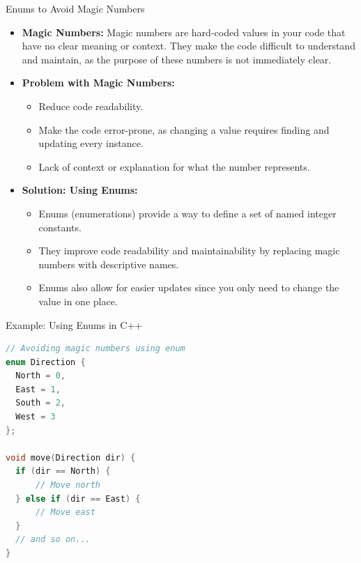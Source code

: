 \documentclass[10pt]{beamer}
\begin{document}
\begin{frame}{Enums to Avoid Magic Numbers}
  \begin{itemize}
      \item \textbf{Magic Numbers:} Magic numbers are hard-coded values in your code that have no clear meaning or context. They make the code difficult to understand and maintain, as the purpose of these numbers is not immediately clear.
      
      \item \textbf{Problem with Magic Numbers:} 
      \begin{itemize}
          \item Reduce code readability.
          \item Make the code error-prone, as changing a value requires finding and updating every instance.
          \item Lack of context or explanation for what the number represents.
      \end{itemize}
      
      \item \textbf{Solution: Using Enums:} 
      \begin{itemize}
          \item Enums (enumerations) provide a way to define a set of named integer constants.
          \item They improve code readability and maintainability by replacing magic numbers with descriptive names.
          \item Enums also allow for easier updates since you only need to change the value in one place.
      \end{itemize}
  \end{itemize}
\end{frame}

\begin{frame}[fragile]{Example: Using Enums in C++}
  \begin{lstlisting}[language=C++]
// Avoiding magic numbers using enum
enum Direction {
  North = 0,
  East = 1,
  South = 2,
  West = 3
};

void move(Direction dir) {
  if (dir == North) {
      // Move north
  } else if (dir == East) {
      // Move east
  }
  // and so on...
}
  \end{lstlisting}
\end{frame}
\end{document}
